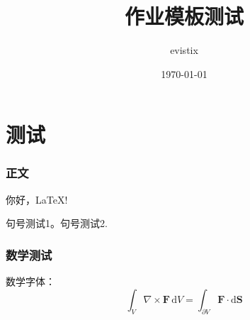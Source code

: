 \documentclass[theme = fancy, zihao = 5]{work-template}
\title{作业模板测试}
\author{evistix}
\date{\today}
\begin{document}
\maketitle

\part{测试}
\section{正文}
你好，\LaTeX!\par
句号测试1。句号测试2.

\section{数学测试}

数学字体：
\begin{equation}
    \int_V \nabla\times \symbf F\,\mathrm{d}V = \int_{\partial V} \symbf F\cdot\mathrm{d}\symbf S 
\end{equation}
\end{document}
